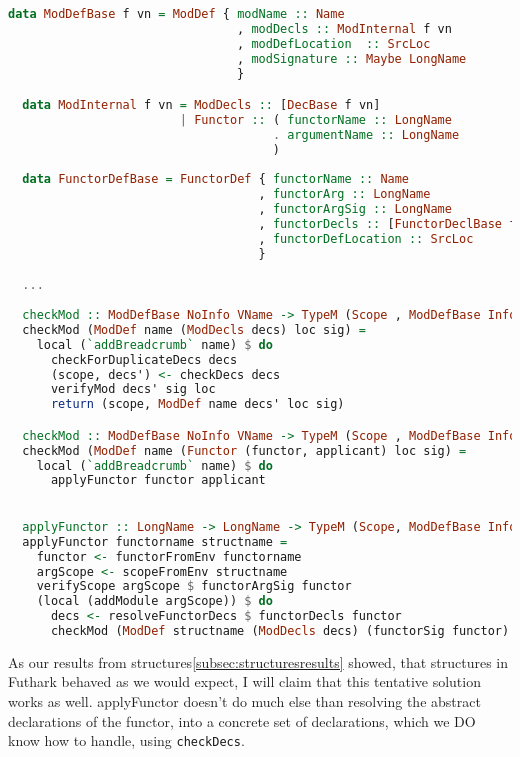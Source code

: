 \begin{lstlisting}[language=Haskell]
  data ModDefBase f vn = ModDef { modName :: Name
                                , modDecls :: ModInternal f vn
                                , modDefLocation  :: SrcLoc
                                , modSignature :: Maybe LongName
                                }

  data ModInternal f vn = ModDecls :: [DecBase f vn]
                        | Functor :: ( functorName :: LongName
                                     . argumentName :: LongName
                                     )
  
  data FunctorDefBase = FunctorDef { functorName :: Name
                                   , functorArg :: LongName
                                   , functorArgSig :: LongName
                                   , functorDecls :: [FunctorDeclBase f vn]
                                   , functorDefLocation :: SrcLoc
                                   }

  ...
                                     
  checkMod :: ModDefBase NoInfo VName -> TypeM (Scope , ModDefBase Info VName)
  checkMod (ModDef name (ModDecls decs) loc sig) =
    local (`addBreadcrumb` name) $ do
      checkForDuplicateDecs decs
      (scope, decs') <- checkDecs decs
      verifyMod decs' sig loc
      return (scope, ModDef name decs' loc sig)

  checkMod :: ModDefBase NoInfo VName -> TypeM (Scope , ModDefBase Info VName)
  checkMod (ModDef name (Functor (functor, applicant) loc sig) =
    local (`addBreadcrumb` name) $ do
      applyFunctor functor applicant

  
  applyFunctor :: LongName -> LongName -> TypeM (Scope, ModDefBase Info VName)
  applyFunctor functorname structname =
    functor <- functorFromEnv functorname
    argScope <- scopeFromEnv structname    
    verifyScope argScope $ functorArgSig functor
    (local (addModule argScope)) $ do
      decs <- resolveFunctorDecs $ functorDecls functor
      checkMod (ModDef structname (ModDecls decs) (functorSig functor) (functorDefLocation functor))
\end{lstlisting}

As our results from structures\ref{subsec:structuresresults} showed, that structures in
Futhark behaved as we would expect, I will claim that this tentative solution
works as well.
applyFunctor doesn't do much else than resolving the abstract declarations of
the functor, into a concrete set of declarations, which we DO know how to
handle, using \texttt{checkDecs}.
